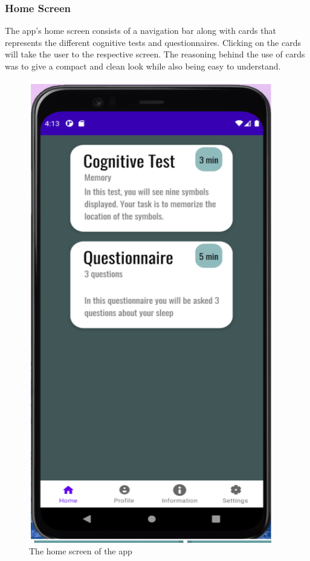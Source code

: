 \documentclass{article}
\begin{document}
\subsubsection{Home Screen}
The app’s home screen consists of a navigation bar along with cards that represents the different cognitive tests and questionnaires. Clicking on the cards will take the user to the respective screen. The reasoning behind the use of cards was to give a compact and clean look while also being easy to understand.

\begin{figure}[H]
  \begin{center}
    \includegraphics[scale=0.8]{Android1.png}
    \caption{The home screen of the app
}
    \label{fig:android1}
  \end{center}
\end{figure}
\end{document}
